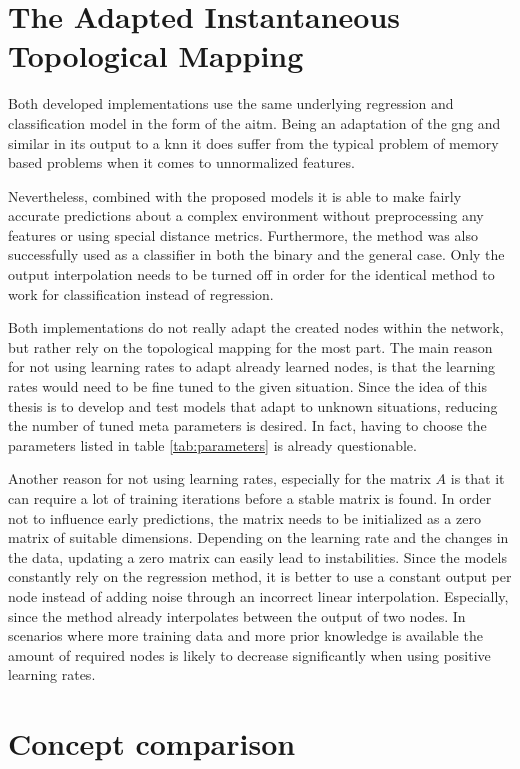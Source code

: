 \section{The Adapted Instantaneous Topological Mapping} %

Both developed implementations use the same underlying regression and classification model in the form of the \gls{aitm}. Being an adaptation of the \gls{gng} and similar in its output to a \gls{knn} it does suffer from the typical problem of memory based problems when it comes to unnormalized features. 

Nevertheless, combined with the proposed models it is able to make fairly accurate predictions about a complex environment without preprocessing any features or using special distance metrics. Furthermore, the method was also successfully used as a classifier in both the binary and the general case. Only the output interpolation needs to be turned off in order for the identical method to work for classification instead of regression. 

Both implementations do not really adapt the created nodes within the network, but rather rely on the topological mapping for the most part. The main reason for not using learning rates to adapt already learned nodes, is that the learning rates would need to be fine tuned to the given situation. Since the idea of this thesis is to develop and test models that adapt to unknown situations, reducing the number of tuned meta parameters is desired. In fact, having to choose the parameters listed in table \ref{tab:parameters} is already questionable.

Another reason for not using learning rates, especially for the matrix $A$ is that it can require a lot of training iterations before a stable matrix is found. In order not to influence early predictions, the matrix needs to be initialized as a zero matrix of suitable dimensions. Depending on the learning rate and the changes in the data, updating a zero matrix can easily lead to instabilities.
Since the models constantly rely on the regression method, it is better to use a constant output per node instead of adding noise through an incorrect linear interpolation. Especially, since the method already interpolates between the output of two nodes.
In scenarios where more training data and more prior knowledge is available the amount of required nodes is likely to decrease significantly when using positive learning rates.

\section{Concept comparison}

